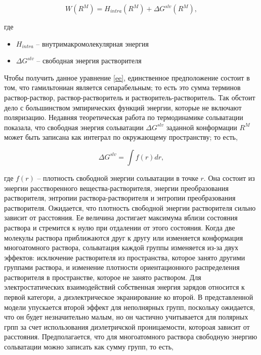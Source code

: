 \begin{equation}
	W(R^M) = H_{intra}(R^M) + \Delta G^{slv}(R^M),
	\label{ee}
\end{equation}

где 

\begin{itemize}
	\item $H_{intra}$ -- внутримакромолекулярная энергия
	\item $\Delta G^{slv}$ -- свободная энергия растворителя
\end{itemize}

Чтобы получить данное уравнение \ref{ee}, единственное предположение состоит в том, что гамильтониан является сепарабельным; то есть это сумма терминов раствор-раствор, раствор-растворитель и растворитель-растворитель. Так обстоит дело с большинством эмпирических функций энергии, которые не включают поляризацию. Недавняя теоретическая работа по термодинамике сольватации показала, что свободная энергия сольватации $\Delta G^{slv}$ заданной конформации $R^M$ может быть записана как интеграл по окружающему пространству; то есть,

\begin{equation}
	\Delta G^{slv} = \int f(r)dr,
	\label{fe}
\end{equation}

где $f(r)$ -- плотность свободной энергии сольватации в точке $r$. Она состоит из энергии расстворенного вещества-растворителя, энергии преобразования растворителя, энтропии раствора-растворителя и энтропии преобразования растворителя. Ожидается, что плотность свободной энергии растворителя сильно зависит от расстояния. Ее величина достигает максимума вблизи состояния раствора и стремится к нулю при отдалении от этого состояния. Когда две молекулы раствора приближаются друг к другу или изменяется конформация многоатомного раствора, сольватация каждой группы изменяется из-за двух эффектов: исключение растворителя из пространства, которое занято другими группами раствора, и изменение плотности ориентационного распределения растворителя в пространстве, которое не занято раствором. Для электростатических взаимодействий собственная энергия зарядов относится к первой категори, а диэлектрическое экранирование ко второй. В представленной модели упускается второй эффект для неполнярных групп, поскольку ожидается, что он будет незначительно малым, но он частично учитывается для полярных грпп за счет использования диэлетричской проницаемости, котороая зависит от расстояния. Предполагается, что для многоатомного раствора свободную энергию сольватации можно записать как сумму групп, то есть,

